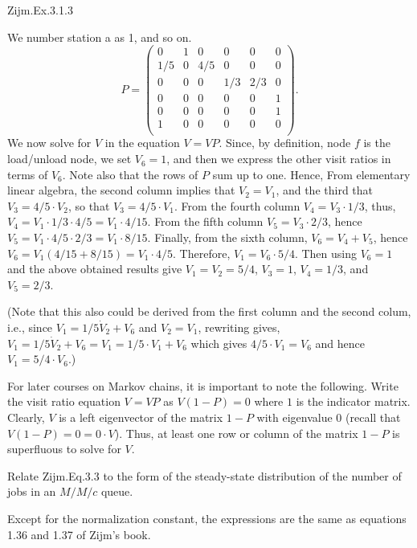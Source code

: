 \begin{exercise}
Zijm.Ex.3.1.3
\begin{solution}
We number  station a as 1, and so on.
\begin{equation*}
  P = 
  \begin{pmatrix}
     0 & 1 & 0 & 0 & 0 &0 \\
     1/5 & 0 & 4/5 & 0 & 0 & 0\\
     0& 0 & 0 & 1/3 & 2/3 & 0 \\
     0 & 0 & 0 & 0 & 0 & 1\\
     0 & 0 & 0 & 0 & 0 & 1\\
     1 & 0 & 0 & 0 & 0 & 0\\
  \end{pmatrix}.
\end{equation*}
We now solve for $V$ in the equation $V = VP$.
Since, by definition, node $f$ is the load/unload node, we set $V_6=1$, and then we express the other visit ratios in terms of $V_6$.
Note also that the rows of $P$ sum up to one.
Hence, From elementary linear algebra, the second column implies that $V_2 = V_1$, and the third that $V_3 = 4/5 \cdot V_2$, so that $V_3 = 4/5 \cdot V_1$.
From the fourth column $V_4 = V_3 \cdot 1/3 $, thus, $V_4 = V_1 \cdot 1/3 \cdot 4/5 = V_1 \cdot 4/15$.
From the fifth column $V_5 = V_3 \cdot 2/3$, hence $V_5 = V_1 \cdot 4/5 \cdot 2/3 = V_1 \cdot 8/15$.
Finally, from the sixth column, $V_6 = V_4+V_5$, hence $V_6 = V_1 (4/15 + 8/15)=V_1 \cdot 4/5$.
Therefore, $V_1 = V_6 \cdot 5/4$.
Then using $V_6 = 1$ and the above obtained results give $V_1 = V_2 = 5/4$, $V_3 = 1$, $V_4 = 1/3$, and $V_5 = 2/3$.

(Note that this also could be derived from the first column and the second colum, i.e., since $V_1 = 1/5 \dot V_2 + V_6$ and $V_2 = V_1$, rewriting gives, $V_1 = 1/5 \dot V_2 + V_6 = V_1 = 1/5 \cdot V_1 + V_6$ which gives $4/5 \cdot V_1 = V_6$ and hence $V_1 = 5/4 \cdot V_6$.)

For later courses on Markov chains, it is important to note the following.
Write the visit ratio equation $V = VP$ as $V(1-P)=0$ where $1$ is the indicator matrix.
Clearly, $V$ is a left eigenvector of the matrix $1-P$ with eigenvalue 0 (recall that $V(1-P) = 0 = 0\cdot V$).
Thus, at least one row or column of the matrix $1-P$ is superfluous to solve for $V$.
\end{solution}
\end{exercise}

\begin{exercise}
  Relate Zijm.Eq.3.3 to the form of the steady-state distribution of
  the number of jobs in an $M/M/c$ queue.
\begin{solution}
    Except for the normalization constant, the expressions are the
    same as equations 1.36 and 1.37 of Zijm's book.
\end{solution}
\end{exercise}

